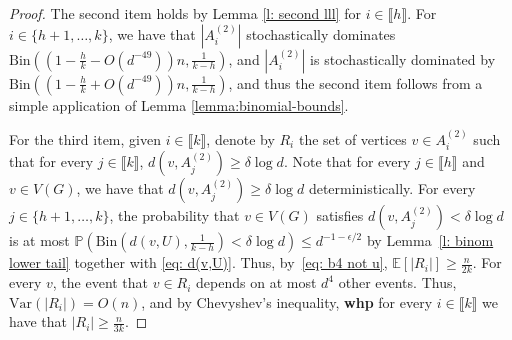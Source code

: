 \documentclass[notitlepage]{scrartcl}
\newcommand{\br}[1]{\llbracket{#1}\rrbracket}
\begin{document}
\begin{proof}
    The second item holds by Lemma \ref{l: second lll} for $i\in \br{h}$. For $i\in \{h+1,\ldots,k\}$, we have that $|A_i^{(2)}|$ stochastically dominates $\text{Bin}\left(\left(1-\frac{h}{k}-O(d^{-49})\right)n,\frac{1}{k-h}\right)$, and $|A_i^{(2)}|$ is stochastically dominated by $\text{Bin}\left(\left(1-\frac{h}{k}+O(d^{-49})\right)n,\frac{1}{k-h}\right)$, and thus the second item follows from a simple application of Lemma \ref{lemma:binomial-bounds}. 

   For the third item, given $i\in \br{k}$, denote by $R_i$ the set of vertices $v\in A_i^{(2)}$ such that for every $j\in \br{k}$, $d(v,A_j^{(2)})\ge \delta\log d$. Note that for every $j\in \br{h}$ and $v\in V(G)$, we have that $d(v, A_j^{(2)})\ge \delta\log d$ deterministically. For every $j\in \{h+1,\ldots, k\}$, the probability that $v\in V(G)$ satisfies $d(v,A_j^{(2)})<\delta\log d$ is at most $\mathbb{P}\left(\text{Bin}\left(d(v,U),\frac{1}{k-h}\right)<\delta\log d\right)\le d^{-1-\epsilon/2}$ by Lemma~\ref{l: binom lower tail} together with \eqref{eq: d(v,U)}. Thus, by~\eqref{eq: b4 not u}, $\mathbb{E}[|R_i|]\ge \frac{n}{2k}$. For every $v$, the event that $v\in R_i$ depends on at most $d^4$ other events. Thus, $\text{Var}(|R_i|)=O(n)$, and by Chevyshev's inequality, \textbf{whp} for every $i\in \br{k}$ we have that $|R_i|\ge \frac{n}{3k}$.
\end{proof}
\end{document}
